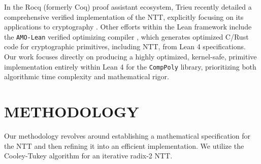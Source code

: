 \documentclass[a4paper,12pt]{report}
\begin{document}
In the Rocq (formerly Coq) proof assistant ecosystem, Trieu recently detailed a comprehensive verified implementation of the NTT, explicitly focusing on its applications to cryptography \cite{trieu_ntt_2026}. Other efforts within the Lean framework include the \texttt{AMO-Lean} verified optimizing compiler \cite{amolean_2026}, which generates optimized C/Rust code for cryptographic primitives, including NTT, from Lean 4 specifications. Our work focuses directly on producing a highly optimized, kernel-safe, primitive implementation entirely within Lean 4 for the \texttt{CompPoly} library, prioritizing both algorithmic time complexity and mathematical rigor.
\newpage

\chapter{METHODOLOGY}
Our methodology revolves around establishing a mathematical specification for the NTT and then refining it into an efficient implementation. We utilize the Cooley-Tukey algorithm for an iterative radix-2 NTT.
\end{document}
